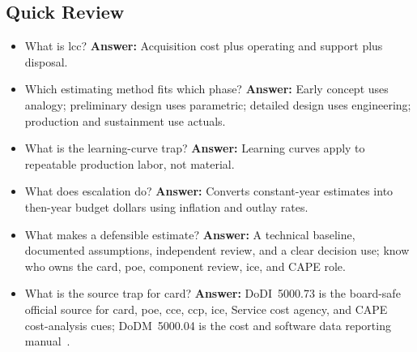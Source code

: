 \documentclass[../main.tex]{subfiles}
\begin{document}
\subsection{Quick Review}
\begin{itemize}
  \item What is \ac{lcc}? \textbf{Answer:} Acquisition cost plus operating and support plus disposal.
  \item Which estimating method fits which phase? \textbf{Answer:} Early concept uses analogy; preliminary design uses
  parametric; detailed design uses engineering; production and sustainment use actuals.
  \item What is the learning-curve trap? \textbf{Answer:} Learning curves apply to repeatable production labor, not
  material.
  \item What does escalation do? \textbf{Answer:} Converts constant-year estimates into then-year budget dollars using
  inflation and outlay rates.
  \item What makes a defensible estimate? \textbf{Answer:} A technical baseline, documented assumptions, independent
  review, and a clear decision use; know who owns the \ac{card}, \ac{poe}, component review, \ac{ice}, and CAPE role.
  \item What is the source trap for \ac{card}? \textbf{Answer:} DoDI~5000.73 is the board-safe official source for \ac{card},
  \ac{poe}, \ac{cce}, \ac{ccp}, \ac{ice}, Service cost agency, and CAPE cost-analysis cues; DoDM~5000.04 is the cost and
  software data reporting manual~\autocite{DoDI5000-73-Cost-Analysis-2024,DoDM5000-04-CSDR-2021}.
\end{itemize}

\end{document}
